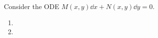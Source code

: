 Consider the ODE $M(x,y)\dd{x} + N(x,y)\dd{y} = 0.$
\begin{enumerate}
    \item  \vspace{.5cm}
    \item 
  \end{enumerate}